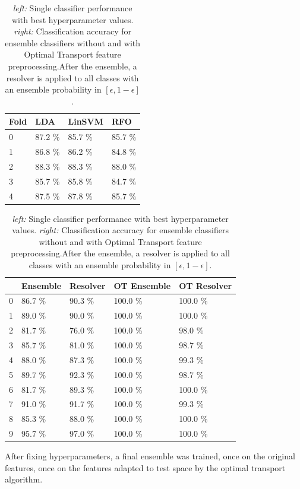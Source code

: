 \documentclass[10pt,a4paper]{article}
\begin{document}
\begin{table}
\begin{tabular}{llll}
\toprule
{Fold} &    LDA & LinSVM & RFO\\
\midrule
0 & 87.2 \% &             85.7 \% &          85.7 \% \\
1 & 86.8 \% &             86.2 \% &          84.8 \% \\
2 & 88.3 \% &             88.3 \% &          88.0 \% \\
3 & 85.7 \% &             85.8 \% &          84.7 \% \\
4 & 87.5 \% &             87.8 \% &          85.7 \% \\
\bottomrule
\end{tabular}
\quad
\begin{tabular}{lllll}
\toprule
{} & Ensemble & Resolver & OT Ensemble & OT Resolver \\
\midrule
0 &   86.7 \% & 90.3 \% &     100.0 \% &  100.0 \% \\
1 &   89.0 \% & 90.0 \% &     100.0 \% &  100.0 \% \\
2 &   81.7 \% & 76.0 \% &     100.0 \% &   98.0 \% \\
3 &   85.7 \% & 81.0 \% &     100.0 \% &   98.7 \% \\
4 &   88.0 \% & 87.3 \% &     100.0 \% &   99.3 \% \\
5 &   89.7 \% & 92.3 \% &     100.0 \% &   98.7 \% \\
6 &   81.7 \% & 89.3 \% &     100.0 \% &  100.0 \% \\
7 &   91.0 \% & 91.7 \% &     100.0 \% &   99.3 \% \\
8 &   85.3 \% & 88.0 \% &     100.0 \% &  100.0 \% \\
9 &   95.7 \% & 97.0 \% &     100.0 \% &  100.0 \% \\
\bottomrule
\end{tabular}

\caption{\emph{left:} Single classifier performance with best hyperparameter values.
\emph{right:} Classification accuracy for ensemble classifiers without and with Optimal Transport feature preprocessing.After the ensemble, a resolver is applied to all classes with an ensemble probability in $[\epsilon,1-\epsilon]$.}
\label{tbl:results}
\end{table}

After fixing hyperparameters, a final ensemble was trained, once on the original features, once on the features adapted to test space by the optimal transport algorithm.
\end{document}
